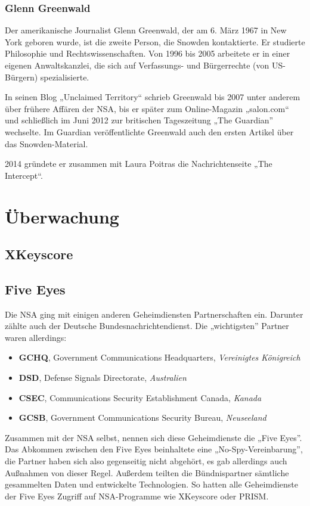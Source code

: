 \documentclass[12pt,a4paper]{scrartcl}
\begin{document}
\subsubsection{Glenn Greenwald}
Der amerikanische Journalist Glenn Greenwald, der am 6. März 1967 in New York geboren wurde, ist die zweite Person, die Snowden kontaktierte. Er studierte Philosophie und Rechtswissenschaften.\cite{wiki_greenwald} Von 1996 bis 2005 arbeitete er in einer eigenen Anwaltskanzlei, die sich auf Verfassungs- und Bürgerrechte (von US-Bürgern) spezialisierte.\cite{unclaimed_response}

In seinen Blog „Unclaimed Territory“ schrieb Greenwald bis 2007 unter anderem über frühere Affären der NSA, bis er später zum Online-Magazin „salon.com“ und schließlich im Juni 2012 zur britischen Tageszeitung „The Guardian” wechselte. Im Guardian veröffentlichte Greenwald auch den ersten Artikel über das Snowden-Material.\cite{wiki_greenwald}

2014 gründete er zusammen mit Laura Poitras die Nachrichtenseite „The Intercept“.\cite{intercept_about}

\section{Überwachung}

\subsection{XKeyscore}


\subsection{Five Eyes}
Die NSA ging mit einigen anderen Geheimdiensten Partnerschaften ein. Darunter zählte auch der Deutsche Bundesnachrichtendienst. Die „wichtigsten” Partner waren allerdings:
\begin{itemize}
\item \textbf{GCHQ}, Government Communications Headquarters, \emph{Vereinigtes Königreich}
\item \textbf{DSD}, Defense Signals Directorate, \emph{Australien}
\item \textbf{CSEC}, Communications Security Establishment Canada, \emph{Kanada}
\item \textbf{GCSB}, Government Communications Security Bureau, \emph{Neuseeland}
\end{itemize}

Zusammen mit der NSA selbst, nennen sich diese Geheimdienste die „Five Eyes”.
Das Abkommen zwischen den Five Eyes beinhaltete eine „No-Spy-Vereinbarung”, die Partner haben sich also gegenseitig nicht abgehört, es gab allerdings auch Außnahmen von dieser Regel. Außerdem teilten die Bündnispartner sämtliche gesammelten Daten und entwickelte Technologien. So hatten alle Geheimdienste der Five Eyes Zugriff auf NSA-Programme wie XKeyscore oder PRISM.
\end{document}
